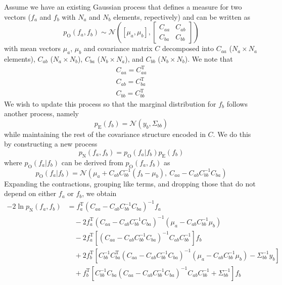 \documentclass[onecolumn]{article}
\begin{document}
Assume we have an existing Gaussian process that defines a measure for two vectors ($f_a$ and $f_b$ with $N_a$ and $N_b$ elements, repectively) and can be written as
\begin{equation}
    p_\mathrm{O}(f_a, f_b) \sim \mathcal{N}\left( [\mu_a, \mu_b], \begin{bmatrix} C_{aa} & C_{ab} \\ C_{ba} & C_{bb} \end{bmatrix}\right)
\end{equation}
with mean vectors $\mu_a$, $\mu_b$ and covariance matrix $C$ decomposed into $C_{aa}$ ($N_a \times N_a$ elements), $C_{ab}$ ($N_a \times N_b$), $C_{ba}$ ($N_b \times N_a$), and $C_{bb}$ ($N_b \times N_b$).
We note that
\begin{gather}
    C_{aa} = C_{aa}^\mathrm{T} \\
    C_{ab} = C_{ba}^\mathrm{T} \\
    C_{bb} = C_{bb}^\mathrm{T}
\end{gather}
We wish to update this process so that the marginal distribution for $f_b$ follows another process, namely
\begin{equation}
    p_\mathrm{E}(f_b) = \mathcal{N}\left( y_b, \Sigma_{bb} \right)
\end{equation}
while maintaining the rest of the covariance structure encoded in $C$.
We do this by constructing a new process
\begin{equation}
    p_\mathrm{N}(f_a, f_b) = p_\mathrm{O}(f_a|f_b) p_\mathrm{E}(f_b)
\end{equation}
where $p_\mathrm{O}(f_a|f_b)$ can be derived from $p_\mathrm{O}(f_a, f_b)$ as
\begin{equation}
    p_\mathrm{O}(f_a|f_b) = \mathcal{N}\left( \mu_a + C_{ab} C_{bb}^{-1} (f_b - \mu_b),\ C_{aa} - C_{ab} C_{bb}^{-1} C_{ba} \right)
\end{equation}
Expanding the contractions, grouping like terms, and dropping those that do not depend on either $f_a$ or $f_b$, we obtain
\begin{align}
    -2\ln p_\mathrm{N}(f_a, f_b) 
        & = f_a^\mathrm{T} \left(C_{aa} - C_{ab} C_{bb}^{-1} C_{ba}\right)^{-1} f_a \nonumber \\
        & \quad - 2 f_a^\mathrm{T} \left(C_{aa} - C_{ab} C_{bb}^{-1} C_{ba}\right)^{-1} \left(\mu_a - C_{ab} C_{bb}^{-1} \mu_b \right) \nonumber \\
        & \quad - 2 f_a^\mathrm{T} \left[ \left(C_{aa} - C_{ab} C_{bb}^{-1} C_{ba}\right)^{-1} C_{ab} C_{bb}^{-1} \right] f_b \nonumber \\
        & \quad + 2 f_b^\mathrm{T} \left[ C_{bb}^{-1} C_{ba}^\mathrm{T} \left(C_{aa} - C_{ab} C_{bb}^{-1} C_{ba}\right)^{-1} \left(\mu_a - C_{ab} C_{bb}^{-1} \mu_b\right) - \Sigma_{bb}^{-1} y_b \right] \nonumber \\
        & \quad + f_b^\mathrm{T} \left[ C_{bb}^{-1} C_{ba} \left(C_{aa} - C_{ab} C_{bb}^{-1} C_{ba}\right)^{-1} C_{ab} C_{bb}^{-1} + \Sigma_{bb}^{-1} \right] f_b
\end{align}
\end{document}
